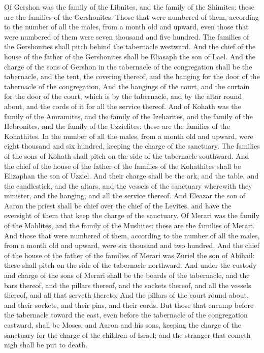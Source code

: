 \begin{biblechapter}
\verse Of Gershon was the family of the Libnites, and the family of the Shimites: these are the families of the Gershonites.
\verse Those that were numbered of them, according to the number of all the males, from a month old and upward, even those that were numbered of them were seven thousand and five hundred.
\verse The families of the Gershonites shall pitch behind the tabernacle westward.
\verse And the chief of the house of the father of the Gershonites shall be Eliasaph the son of Lael.
\verse And the charge of the sons of Gershon in the tabernacle of the congregation shall be the tabernacle, and the tent, the covering thereof, and the hanging for the door of the tabernacle of the congregation,
\verse And the hangings of the court, and the curtain for the door of the court, which is by the tabernacle, and by the altar round about, and the cords of it for all the service thereof.
\verse And of Kohath was the family of the Amramites, and the family of the Izeharites, and the family of the Hebronites, and the family of the Uzzielites: these are the families of the Kohathites.
\verse In the number of all the males, from a month old and upward, were eight thousand and six hundred, keeping the charge of the sanctuary.
\verse The families of the sons of Kohath shall pitch on the side of the tabernacle southward.
\verse And the chief of the house of the father of the families of the Kohathites shall be Elizaphan the son of Uzziel.
\verse And their charge shall be the ark, and the table, and the candlestick, and the altars, and the vessels of the sanctuary wherewith they minister, and the hanging, and all the service thereof.
\verse And Eleazar the son of Aaron the priest shall be chief over the chief of the Levites, and have the oversight of them that keep the charge of the sanctuary.
\verse Of Merari was the family of the Mahlites, and the family of the Mushites: these are the families of Merari.
\verse And those that were numbered of them, according to the number of all the males, from a month old and upward, were six thousand and two hundred.
\verse And the chief of the house of the father of the families of Merari was Zuriel the son of Abihail: these shall pitch on the side of the tabernacle northward.
\verse And under the custody and charge of the sons of Merari shall be the boards of the tabernacle, and the bars thereof, and the pillars thereof, and the sockets thereof, and all the vessels thereof, and all that serveth thereto,
\verse And the pillars of the court round about, and their sockets, and their pins, and their cords.
\verse But those that encamp before the tabernacle toward the east, even before the tabernacle of the congregation eastward, shall be Moses, and Aaron and his sons, keeping the charge of the sanctuary for the charge of the children of Israel; and the stranger that cometh nigh shall be put to death.

\end{biblechapter}

